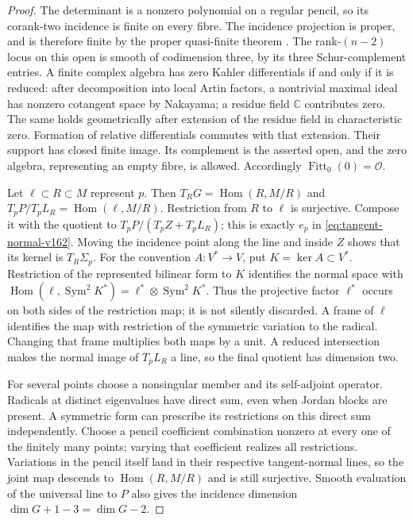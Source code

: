 \documentclass[11pt,reqno]{amsart}
\numberwithin{equation}{section}
\theoremstyle{definition}\newtheorem{definition}[theorem]{Definition}
\theoremstyle{remark}\newtheorem{remark}[theorem]{Remark}
\newcommand{\C}{\mathbb C}\newcommand{\Q}{\mathbb Q}
\newcommand{\OO}{\mathcal O}\newcommand{\II}{\mathcal I}
\DeclareMathOperator{\Sym}{Sym}\DeclareMathOperator{\Gr}{Gr}
\DeclareMathOperator{\Hom}{Hom}\DeclareMathOperator{\Tot}{Tot}
\DeclareMathOperator{\Fitt}{Fitt}\DeclareMathOperator{\Ann}{Ann}
\begin{document}
\begin{proof}
The determinant is a nonzero polynomial on a regular pencil, so its
corank-two incidence is finite on every fibre. The incidence projection
is proper, and is therefore finite by the proper quasi-finite theorem
\cite[Tag~02LS]{StacksProject160}. The rank-$(n-2)$ locus on this open
is smooth of codimension three, by its three Schur-complement entries.
A finite complex algebra has zero Kahler differentials if and only if
it is reduced: after decomposition into local Artin factors, a
nontrivial maximal ideal has nonzero cotangent space by Nakayama;
a residue field $\C$ contributes zero. The same holds geometrically
after extension of the residue field in characteristic zero. Formation
of relative differentials commutes with that extension. Their support
has closed finite image. Its complement is the asserted open, and
the zero algebra, representing an empty fibre, is allowed. Accordingly
$\Fitt_0(0)=\OO$.

Let $\ell\subset R\subset M$ represent $p$. Then
$T_RG=\Hom(R,M/R)$ and
$T_pP/T_pL_R=\Hom(\ell,M/R)$. Restriction from $R$ to $\ell$
is surjective. Compose it with the quotient to
$T_pP/(T_pZ+T_pL_R)$; this is exactly $e_p$ in
\eqref{eq:tangent-normal-v162}. Moving the incidence point along
the line and inside $Z$ shows that its kernel is $T_R\Sigma_p$.
For the convention $A:V^*\to V$, put $K=\ker A\subset V^*$.
Restriction of the represented bilinear form to $K$ identifies the
normal space with $\Hom(\ell,\Sym^2K^*)=
\ell^*\otimes\Sym^2K^*$. Thus the projective factor $\ell^*$ occurs on both sides
of the restriction map; it is not silently discarded. A frame of
$\ell$ identifies the map with restriction of the symmetric variation
to the radical. Changing that frame multiplies both maps by a unit.
A reduced intersection makes the normal image of $T_pL_R$ a line,
so the final quotient has dimension two.

For several points choose a nonsingular member and its self-adjoint
operator. Radicals at distinct eigenvalues have direct sum, even
when Jordan blocks are present. A symmetric form can prescribe its
restrictions on this direct sum independently. Choose a pencil
coefficient combination nonzero at every one of the finitely many
points; varying that coefficient realizes all restrictions. Variations
in the pencil itself land in their respective tangent-normal lines,
so the joint map descends to $\Hom(R,M/R)$ and is still surjective.
Smooth evaluation of the universal line to $P$ also gives the
incidence dimension $\dim G+1-3=\dim G-2$.


\end{proof}
\end{document}
